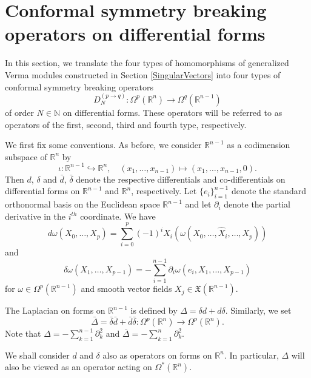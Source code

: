 \documentclass[a4paper,12pt,reqno]{amsart}
\numberwithin{theorem}{subsection}
\numberwithin{equation}{section}
\begin{document}
\section{Conformal symmetry breaking operators on differential forms}\label{DiffOp}

In this section, we translate the four types of homomorphisms of generalized
Verma modules constructed in Section \ref{SingularVectors} into four types of
conformal symmetry breaking operators
\begin{equation*}
   D^{(p\to q)}_N: \Omega^p({\mathbb{R}}^n) \to \Omega^q({\mathbb{R}}^{n-1})
\end{equation*}
of order $N\in{\mathbb{N}}$ on differential forms. These operators will be referred to as
operators of the first, second, third and fourth type, respectively.

We first fix some conventions. As before, we consider ${\mathbb{R}}^{n-1}$ as a
codimension subspace of ${\mathbb{R}}^n$ by
\begin{equation*}
   \iota: {\mathbb{R}}^{n-1} \hookrightarrow {\mathbb{R}}^n,\quad (x_1,\dots,x_{n-1})\mapsto (x_1,\dots ,x_{n-1},0).
\end{equation*}
Then ${d}$, $\delta$ and $\bar{d}$, $\bar{\delta}$ denote the respective
differentials and co-differentials on differential forms on ${\mathbb{R}}^{n-1}$ and
${\mathbb{R}}^n$, respectively. Let $\{e_i\}_{i=1}^{n-1}$ denote the standard orthonormal
basis on the Euclidean space ${\mathbb{R}}^{n-1}$ and let $\partial_i$ denote the partial
derivative in the $i^{th}$ coordinate. We have
\begin{equation*}
   {d} \omega(X_0,\dots,X_{p}) =
   \sum_{i=0}^p(-1)^i X_i\left(\omega(X_0,\dots,\widehat{X}_i,\dots,X_p)\right)
\end{equation*}
and
\begin{equation*}
   \delta \omega(X_1,\dots,X_{p-1}) = -\sum_{i=1}^{n-1} \partial_i\omega(e_i,X_1,\dots,X_{p-1})
\end{equation*}
for $\omega\in\Omega^p({\mathbb{R}}^{n-1})$ and smooth vector fields
$X_j\in{{\mathfrak X}}({\mathbb{R}}^{n-1})$.

The Laplacian on forms on ${\mathbb{R}}^{n-1}$ is defined by $\Delta = \delta d +
d\delta$. Similarly, we set
$$
   \bar{\Delta} = \bar{\delta} \bar{d} + \bar{d}\bar{\delta}: \Omega^p({\mathbb{R}}^n) \to \Omega^p({\mathbb{R}}^n).
$$
Note that $\Delta = -\sum_{k=1}^{n-1}\partial_k^2$ and  $\bar{\Delta} =
-\sum_{k=1}^{n}\partial_k^2$.

We shall consider ${d}$ and $\delta$ also as operators on forms on ${\mathbb{R}}^n$. In
particular, $\Delta$ will also be viewed as an operator acting on
$\Omega^*({\mathbb{R}}^n)$.
\end{document}
